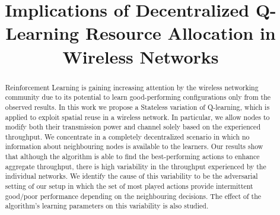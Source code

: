 \documentclass[conference]{IEEEtran}
\begin{document}
	
	\title{Implications of Decentralized Q-Learning Resource Allocation in Wireless Networks}
	
	\author{
		\and
		
		\and
	}
	
	\maketitle
	
	\begin{abstract}
		Reinforcement Learning is gaining increasing attention by the wireless networking community due to its potential to learn good-performing configurations only from the observed results. In this work we propose a Stateless variation of Q-learning, which is applied to exploit spatial reuse in a wireless network. In particular, we allow nodes to modify both their transmission power and channel solely based on the experienced throughput. We concentrate in a completely decentralized scenario in which no information about neighbouring nodes is available to the learners. Our results show that although the algorithm is able to find the best-performing actions to enhance aggregate throughput, there is high variability in the throughput experienced by the individual networks. We identify the cause of this variability to be the adversarial setting of our setup in which the set of most played actions provide intermittent good/poor performance depending on the neighbouring decisions. The effect of the algorithm's learning parameters on this variability is also studied.
		
	\end{abstract}
	
\end{document}
